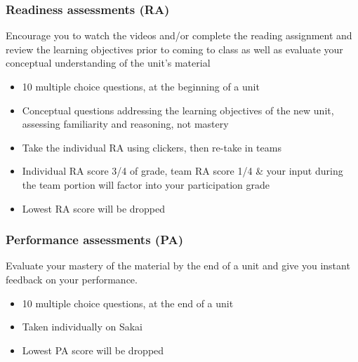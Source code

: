 \documentclass[slidestop,compress,mathserif,12pt,t,professionalfonts,xcolor=table]{beamer}
\begin{document}
\begin{frame}
\frametitle{Readiness assessments (RA)}

 Encourage you to watch the videos and/or complete the reading assignment and review the learning objectives prior to coming to class as well as evaluate your conceptual understanding of the unit's material

\begin{itemize}

\item 10 multiple choice questions, at the beginning of a unit

\item Conceptual questions addressing the learning objectives of the new unit, assessing familiarity and reasoning, not mastery

\item Take the individual RA using clickers, then re-take in teams

\item Individual RA score 3/4 of grade, team RA score 1/4 \& your input during the team portion will factor into your participation grade

\item Lowest RA score will be dropped

\end{itemize}

\end{frame}


\begin{frame}
\frametitle{Performance assessments (PA)}

 Evaluate your mastery of the material by the end of a unit and give you instant feedback on your performance.

\begin{itemize}

\item 10 multiple choice questions, at the end of a unit

\item Taken individually on Sakai

\item Lowest PA score will be dropped

\end{itemize}

\end{frame}

\end{document}
